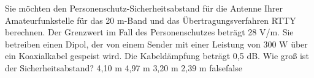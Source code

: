     {Sie möchten den Personenschutz-Sicherheitsabstand für die Antenne Ihrer Amateurfunkstelle für das 20 m-Band und das Übertragungsverfahren RTTY berechnen. Der Grenzwert im Fall des Personenschutzes beträgt 28 V/m. Sie betreiben einen Dipol, der von einem Sender mit einer Leistung von 300 W über ein Koaxialkabel gespeist wird. Die Kabeldämpfung beträgt 0,5 dB. Wie groß ist der Sicherheitsabstand?}
    {4,10 m}
    {4,97 m}
    {3,20 m}
    {2,39 m}
    {false}{false}
